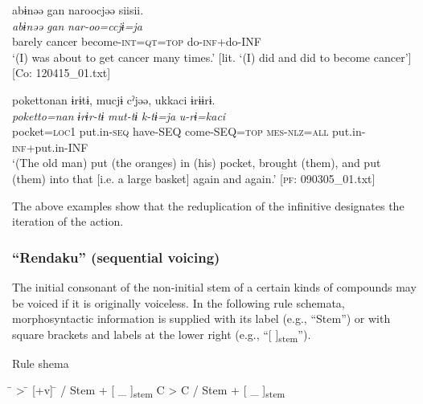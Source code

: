 \ex\label{ex:4.38b}     %
\glll    abɨnəə  gan  naroocjəə  siisii.\\
      \textit{abɨnəə}  \textit{gan}  \textit{nar-oo=ccjɨ=ja}  \textit{}\\
      barely  cancer  become-\textsc{int}=\textsc{qt}=\textsc{top}  do-\textsc{inf}+do-INF\\
      \glt       ‘(I) was about to get cancer many times.’ [lit. ‘(I) did and did to become cancer’] [Co: 120415\_01.txt]

\ex\label{ex:4.38c}%
    \glll   {\textbar}poketto{\textbar}nan  ɨrɨtɨ,  mucjɨ  cˀjəə,  ukkaci   ɨrɨɨrɨ.  \\
      \textit{poketto=nan}  \textit{ɨrɨr-tɨ}  \textit{mut-tɨ}  \textit{k-tɨ=ja}  \textit{u-rɨ=kaci}    \textit{}  \\
      pocket=\textsc{loc}1  put.in-\textsc{seq}  have-SEQ  come-SEQ=\textsc{top}  \textsc{mes}-\textsc{nlz}=\textsc{all}   put.in-\textsc{inf}+put.in-INF  \\
      \glt       ‘(The old man) put (the oranges) in (his) pocket, brought (them), and put (them) into that [i.e. a large basket] again and again.’ [\textsc{pf}: 090305\_01.txt]
    \z
\z

The above examples show that the reduplication of the infinitive designates the iteration of the action.

\subsubsection{“Rendaku” (sequential voicing)}\label{sec:4.2.3.4}

The initial consonant of the non-initial stem of a certain kinds of compounds may be voiced if it is originally voiceless. In the following rule schemata, morphosyntactic information is supplied with its label (e.g., “Stem”) or with square brackets and labels at the lower right (e.g., “[    ]\textsubscript{stem}”).

\ea  Rule shema \label{ex:4.39}
\begin{tabbing}
[\textminus v] \hspace{\tabcolsep}\=\hspace{\tabcolsep} > \hspace{\tabcolsep}\=\hspace{\tabcolsep} [+v] \hspace{\tabcolsep}\=\hspace{\tabcolsep} /  Stem  +  [ \_   ]\textsubscript{stem}\kill
C              \> > \> C \> /  Stem  +  [ \_   ]\textsubscript{stem}\\\relax
[\textminus v] \>   \> [+v] \>
\end{tabbing}
\z

